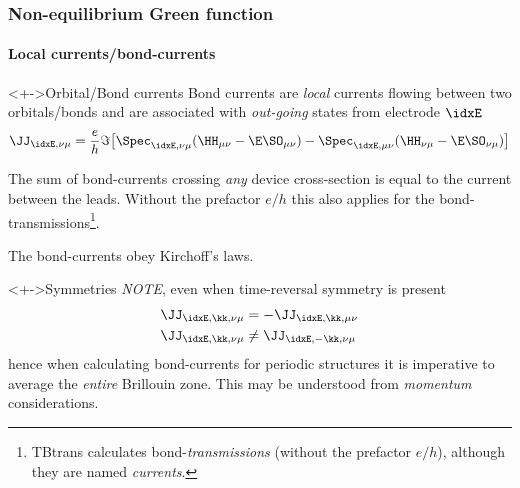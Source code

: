 \begin{frame}
  \frametitle{Non-equilibrium Green function}
  \framesubtitle{Local currents/bond-currents}

  \begin{block}<+->{Orbital/Bond currents}
    Bond currents are \emph{local} currents flowing between two orbitals/bonds and are
    associated with \emph{out-going} states from electrode $\idxE$
    \begin{equation*}
      \JJ_{\idxE,\nu\mu} = \frac e h \Im\big[
      \Spec_{\idxE,\nu\mu}(\HH_{\mu\nu} - \E\SO_{\mu\nu})
      -
      \Spec_{\idxE,\mu\nu}(\HH_{\nu\mu} - \E\SO_{\nu\mu})\big]
    \end{equation*}

    The sum of bond-currents crossing \emph{any} device cross-section is equal to the
    current between the leads. Without the prefactor $e/h$ this also applies for the
    bond-transmissions\footnote{TBtrans calculates bond-\emph{transmissions} (without the
        prefactor $e/h$), although they are named \emph{currents}.}.

    The bond-currents obey Kirchoff's laws.
    
  \end{block}
  
  \begin{block}<+->{Symmetries}
    \emph{NOTE}, even when time-reversal symmetry is present
    \begin{align*}
      \JJ_{\idxE,\kk,\nu\mu} &= - \JJ_{\idxE,\kk,\mu\nu}
      \\
      \JJ_{\idxE,\kk,\nu\mu} &\neq \JJ_{\idxE,-\kk,\nu\mu}
    \end{align*}
    hence when calculating bond-currents for periodic structures it is imperative to
    average the \emph{entire} Brillouin zone. This may be understood from \emph{momentum}
    considerations. 
  \end{block}
  
\end{frame}


